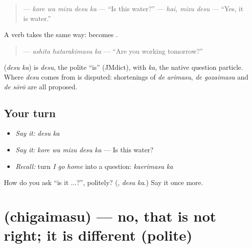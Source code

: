 \begin{quote}
\textbf{ } — \emph{kore wa mizu desu ka} — \textquotedblleft{}Is this water?\textquotedblright{} \textbf{} — \emph{hai, mizu desu} — \textquotedblleft{}Yes, it is water.\textquotedblright{}
\end{quote}

A verb takes \textbf{} the same way: \textbf{} becomes \textbf{}.

\begin{quote}
\textbf{ } — \emph{ashita hatarakimasu ka} — \textquotedblleft{}Are you working tomorrow?\textquotedblright{}
\end{quote}

\begin{cousinweb}
\textbf{} (\emph{desu ka}) is \emph{desu}, the polite \textquotedblleft{}is\textquotedblright{} (JMdict), with \emph{ka}, the native question particle. Where \emph{desu} comes from is disputed: shortenings of \emph{de arimasu}, \emph{de gozaimasu} and \emph{de sōrō} are all proposed.
\end{cousinweb}

\subsection*{Your turn}
\begin{itemize}
\raggedright
  \item \emph{Say it:} \emph{desu ka}
  \item \emph{Say it:} \emph{kore wa mizu desu ka} — Is this water?
  \item \emph{Recall:} turn \emph{I go home} into a question: \emph{kaerimasu ka}
\end{itemize}

\begin{tcolorbox}[breakable,colback=teal!4,colframe=teal!35!black,title={Before you move on}]
How do you ask \textquotedblleft{}is it ...?\textquotedblright{}, politely? (\textbf{}, \emph{desu ka}.) Say it once more.
\end{tcolorbox}
\section[\texorpdfstring{\ja{ちがいます} (chigaimasu)}{ちがいます (chigaimasu)}]{ (chigaimasu) — no, that is not right; it is different (polite)}

